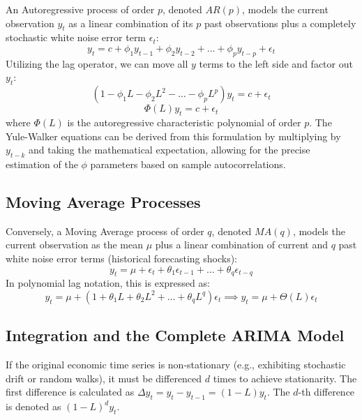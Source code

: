 An Autoregressive process of order $p$, denoted $AR(p)$, models the current observation $y_t$ as a linear combination of its $p$ past observations plus a completely stochastic white noise error term $\epsilon_t$:
\begin{equation}
    y_t = c + \phi_1 y_{t-1} + \phi_2 y_{t-2} + \dots + \phi_p y_{t-p} + \epsilon_t
\end{equation}
Utilizing the lag operator, we can move all $y$ terms to the left side and factor out $y_t$:
\begin{equation}
    \left(1 - \phi_1 L - \phi_2 L^2 - \dots - \phi_p L^p\right) y_t = c + \epsilon_t 
\end{equation}
\begin{equation}
    \Phi(L) y_t = c + \epsilon_t
\end{equation}
where $\Phi(L)$ is the autoregressive characteristic polynomial of order $p$. The Yule-Walker equations can be derived from this formulation by multiplying by $y_{t-k}$ and taking the mathematical expectation, allowing for the precise estimation of the $\phi$ parameters based on sample autocorrelations.

\subsection{Moving Average Processes}
Conversely, a Moving Average process of order $q$, denoted $MA(q)$, models the current observation as the mean $\mu$ plus a linear combination of current and $q$ past white noise error terms (historical forecasting shocks):
\begin{equation}
    y_t = \mu + \epsilon_t + \theta_1 \epsilon_{t-1} + \dots + \theta_q \epsilon_{t-q}
\end{equation}
In polynomial lag notation, this is expressed as:
\begin{equation}
    y_t = \mu + \left(1 + \theta_1 L + \theta_2 L^2 + \dots + \theta_q L^q\right) \epsilon_t \implies y_t = \mu + \Theta(L) \epsilon_t
\end{equation}

\subsection{Integration and the Complete ARIMA Model}
If the original economic time series is non-stationary (e.g., exhibiting stochastic drift or random walks), it must be differenced $d$ times to achieve stationarity. The first difference is calculated as $\Delta y_t = y_t - y_{t-1} = (1-L)y_t$. The $d$-th difference is denoted as $(1-L)^d y_t$. 

